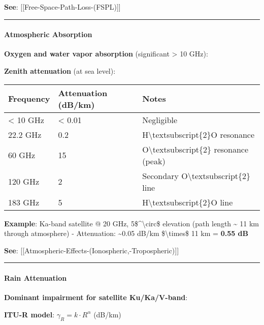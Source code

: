 \textbf{See}: {[}{[}Free-Space-Path-Loss-(FSPL){]}{]}

\begin{center}\rule{0.5\linewidth}{0.5pt}\end{center}

\paragraph{Atmospheric Absorption}\label{atmospheric-absorption}

\textbf{Oxygen and water vapor absorption} (significant \textgreater{}
10 GHz):

\textbf{Zenith attenuation} (at sea level):

{\def\LTcaptype{} %
\begin{longtable}[]{@{}lll@{}}
\toprule\noalign{}
Frequency & Attenuation (dB/km) & Notes \\
\midrule\noalign{}
\endhead
\bottomrule\noalign{}
\endlastfoot
\textless{} 10 GHz & \textless{} 0.01 & Negligible \\
22.2 GHz & 0.2 & H\textbackslash textsubscript\{2\}O resonance \\
60 GHz & 15 & O\textbackslash textsubscript\{2\} resonance (peak) \\
120 GHz & 2 & Secondary O\textbackslash textsubscript\{2\} line \\
183 GHz & 5 & H\textbackslash textsubscript\{2\}O line \\
\end{longtable}
}

\textbf{Example}: Ka-band satellite @ 20 GHz,
5\$\^{}\textbackslash circ\$ elevation (path length \textasciitilde{} 11
km through atmosphere) - Attenuation: \textasciitilde0.05 dB/km
\$\textbackslash times\$ 11 km = \textbf{0.55 dB}

\textbf{See}:
{[}{[}Atmospheric-Effects-(Ionospheric,-Tropospheric){]}{]}

\begin{center}\rule{0.5\linewidth}{0.5pt}\end{center}

\paragraph{Rain Attenuation}\label{rain-attenuation}

\textbf{Dominant impairment for satellite Ku/Ka/V-band}:

\textbf{ITU-R model}: \(\gamma_R = k \cdot R^{\alpha}\) (dB/km)

